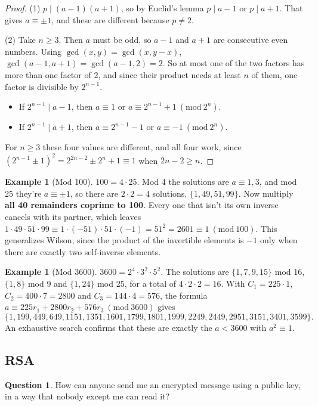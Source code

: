 \documentclass[11pt,a4paper]{article}
\theoremstyle{definition}
\newtheorem{example}[theorem]{Example}
\newcommand{\md}[1]{\ (\mathrm{mod}\ #1)}
\theoremstyle{noteit}
\newtheorem*{question}{Question}
\theoremstyle{note}
\begin{document}
\begin{proof}
(1) $p\mid(a-1)(a+1)$, so by Euclid's lemma $p\mid a-1$ or $p\mid a+1$. That gives $a\equiv\pm1$, and these are different because $p\ne2$.

(2) Take $n\ge3$. Then $a$ must be odd, so $a-1$ and $a+1$ are consecutive even numbers. Using $\gcd(x,y)=\gcd(x,y-x)$, $\gcd(a-1,a+1)=\gcd(a-1,2)=2$. So at most one of the two factors has more than one factor of 2, and since their product needs at least $n$ of them, one factor is divisible by $2^{n-1}$.
\begin{itemize}
\item If $2^{n-1}\mid a-1$, then $a\equiv1$ or $a\equiv2^{n-1}+1\md{2^n}$.
\item If $2^{n-1}\mid a+1$, then $a\equiv2^{n-1}-1$ or $a\equiv-1\md{2^n}$.
\end{itemize}
For $n\ge3$ these four values are different, and all four work, since $(2^{n-1}\pm1)^2=2^{2n-2}\pm2^n+1\equiv1$ when $2n-2\ge n$.
\end{proof}

\begin{example}[Mod 100]
$100=4\cdot25$. Mod 4 the solutions are $a\equiv1,3$, and mod 25 they're $a\equiv\pm1$, so there are $2\cdot2=4$ solutions, $\{1,49,51,99\}$. Now multiply \textbf{all 40 remainders coprime to 100}. Every one that isn't its own inverse cancels with its partner, which leaves $1\cdot49\cdot51\cdot99\equiv1\cdot(-51)\cdot51\cdot(-1)=51^2=2601\equiv1\md{100}$. This generalizes Wilson, since the product of the invertible elements is $-1$ only when there are exactly two self-inverse elements.
\end{example}

\begin{example}[Mod 3600]
$3600=2^4\cdot3^2\cdot5^2$. The solutions are $\{1,7,9,15\}$ mod 16, $\{1,8\}$ mod 9 and $\{1,24\}$ mod 25, for a total of $4\cdot2\cdot2=16$. With $C_1=225\cdot1$, $C_2=400\cdot7=2800$ and $C_3=144\cdot4=576$, the formula $a\equiv225r_1+2800r_2+576r_3\md{3600}$ gives
\[\{1,199,449,649,1151,1351,1601,1799,1801,1999,2249,2449,2951,3151,3401,3599\}.\]
An exhaustive search confirms that these are exactly the $a<3600$ with $a^2\equiv1$.
\end{example}

\subsection{RSA}

\begin{question}
How can anyone send me an encrypted message using a public key, in a way that nobody except me can read it?
\end{question}
\end{document}
